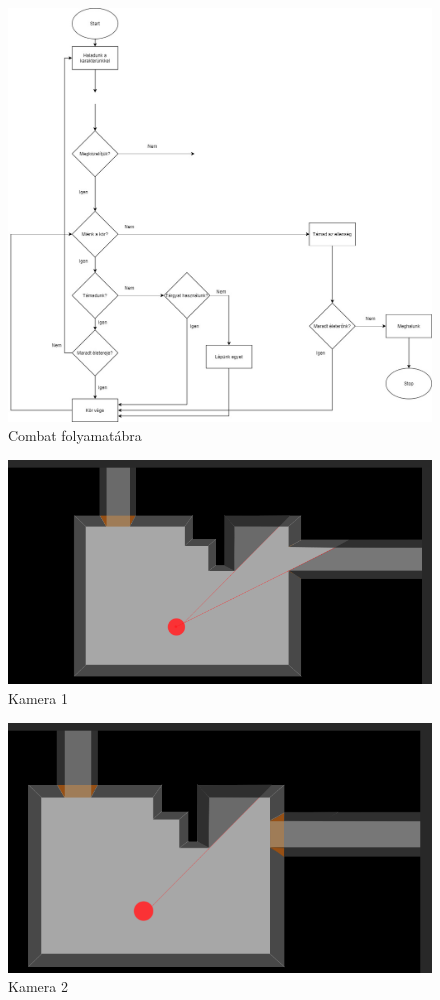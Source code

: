 \begin{figure}[!ht]
	\centering
	\includegraphics[width=\textwidth]{images/image5.png}
	\caption{Combat folyamatábra}
	\label{fig:combat2}
\end{figure}

\begin{figure}[!ht]
	\centering
	\includegraphics[scale=1]{images/image6.png}
	\caption{Kamera 1}
	\label{fig:camera1}
\end{figure}

\begin{figure}[!ht]
	\centering
	\includegraphics[scale=1]{images/image7.png}
	\caption{Kamera 2}
	\label{fig:camera2}
\end{figure}

